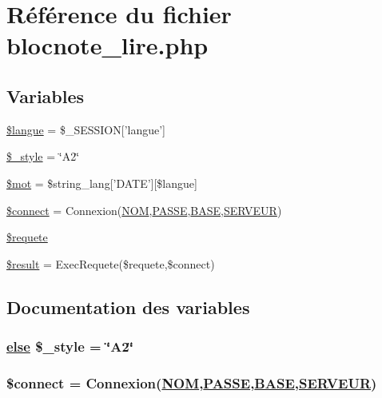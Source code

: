 \hypertarget{blocnote__lire_8php}{
\section{R\'{e}f\'{e}rence du fichier blocnote\_\-lire.php}
\label{blocnote__lire_8php}
}
\subsection*{Variables}
\begin{CompactItemize}
\item 
\hyperlink{blocnote__lire_8php_a0}{\$langue} = \$\_\-SESSION\mbox{[}'langue'\mbox{]}
\item 
\hyperlink{blocnote__lire_8php_a1}{\$\_\-style} = \char`\"{}A2\char`\"{}
\item 
\hyperlink{blocnote__lire_8php_a2}{\$mot} = \$string\_\-lang\mbox{[}'DATE'\mbox{]}\mbox{[}\$langue\mbox{]}
\item 
\hyperlink{blocnote__lire_8php_a3}{\$connect} = Connexion(\hyperlink{pma__connect_8php_a0}{NOM},\hyperlink{pma__connect_8php_a1}{PASSE},\hyperlink{pma__connect_8php_a3}{BASE},\hyperlink{pma__connect_8php_a2}{SERVEUR})
\item 
\hyperlink{blocnote__lire_8php_a4}{\$requete}
\item 
\hyperlink{blocnote__lire_8php_a5}{\$result} = Exec\-Requete(\$requete,\$connect)
\end{CompactItemize}


\subsection{Documentation des variables}
\hypertarget{blocnote__lire_8php_a1}{
\subsubsection[\$\_\-style]{\setlength{\rightskip}{0pt plus 5cm}\hyperlink{cron_8php_a9}{else} \$\_\-style = \char`\"{}A2\char`\"{}}}
\label{blocnote__lire_8php_a1}


\hypertarget{blocnote__lire_8php_a3}{
\subsubsection[\$connect]{\setlength{\rightskip}{0pt plus 5cm}\$connect = Connexion(\hyperlink{pma__connect_8php_a0}{NOM},\hyperlink{pma__connect_8php_a1}{PASSE},\hyperlink{pma__connect_8php_a3}{BASE},\hyperlink{pma__connect_8php_a2}{SERVEUR})}}
\label{blocnote__lire_8php_a3}


